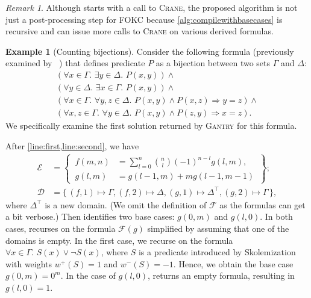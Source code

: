 \documentclass[letterpaper]{article} %
\theoremstyle{remark}
\newtheorem*{remark}{Remark}
\theoremstyle{definition}
\newtheorem{example}{Example}
\newcommand{\Cranetwo}{\textsc{Gantry}}
\begin{document}
\begin{remark}
  Although \CompileWithBaseCases starts with a call to \textsc{Crane}, the
  proposed algorithm is not just a post-processing step for FOKC because
  \cref{alg:compilewithbasecases} is recursive and can issue more calls to
  \textsc{Crane} on various derived formulas.
\end{remark}

\begin{example}[Counting bijections]\label{example:overall}
  Consider the following formula (previously examined by
  \citeauthor{DBLP:conf/kr/DilkasB23}~) that
  defines predicate $P$ as a bijection between two sets $\Gamma$ and $\Delta$:
  \[
    \begin{gathered}
      (\forall x \in \Gamma\text{. }\exists y \in \Delta\text{. }P(x, y))\land{}\\
      (\forall y \in \Delta\text{. }\exists x \in \Gamma\text{. }P(x, y))\land{}\\
      (\forall x \in \Gamma\text{. }\forall y, z \in \Delta\text{. }P(x, y) \land P(x, z) \Rightarrow y = z)\land{}\\
      (\forall x, z \in \Gamma\text{. }\forall y \in \Delta\text{. }P(x, y) \land P(z, y) \Rightarrow x = z).
    \end{gathered}
  \]
  We specifically examine the first solution returned by \Cranetwo{} for this
  formula.

  After \cref{line:first,line:second}, we have
  \begin{align*}
    \mathcal{E} &= \left\{\,\begin{aligned}f(m, n) &= \sum_{l=0}^{n} \binom{n}{l}{(-1)}^{n-l}g(l, m),\\ g(l, m) &= g(l-1, m) + mg(l-1, m-1)\end{aligned}\,\right\};\\
    \mathcal{D} &= \{\, (f, 1) \mapsto \Gamma, (f, 2) \mapsto \Delta, (g, 1) \mapsto \Delta^{\top}, (g, 2) \mapsto \Gamma \,\},
  \end{align*}
  where $\Delta^{\top}$ is a new domain. (We omit the definition of
  $\mathcal{F}$ as the formulas can get a bit verbose.) Then \FindBaseCases
  identifies two base cases: $g(0, m)$ and $g(l, 0)$. In both cases,
  \CompileWithBaseCases recurses on the formula $\mathcal{F}(g)$ simplified by
  assuming that one of the domains is empty. In the first case, we recurse on
  the formula $\forall x \in \Gamma\text{. }S(x) \lor \neg S(x)$, where $S$ is a
  predicate introduced by Skolemization with weights $w^{+}(S) = 1$ and
  $w^{-}(S) = -1$. Hence, we obtain the base case $g(0, m) = 0^{m}$. In the case
  of $g(l, 0)$,  returns an empty formula,
  resulting in $g(l, 0) = 1$.
\end{example}
\end{document}
